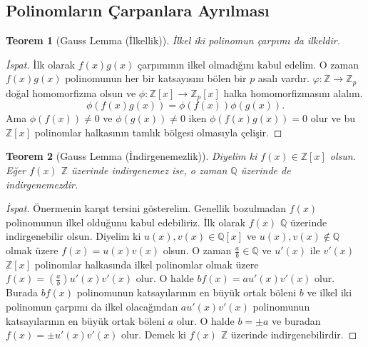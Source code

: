 \documentclass{article}
\newtheorem{thm}{Teorem}[section]
\theoremstyle{definition}
\theoremstyle{remark}
\begin{document}
		\subsection{Polinomların Çarpanlara Ayrılması}
		
		    \begin{thm}[Gauss Lemma (İlkellik)]
		        İlkel iki polinomun çarpımı da ilkeldir.
		    \end{thm}
		    
		    \begin{proof}[İspat]
		        İlk olarak $f(x)g(x)$ çarpımının ilkel olmadığını kabul edelim. O zaman $f(x)g(x)$ polinomunun her bir katsayısını bölen bir $p$ asalı vardır.
		        $\varphi: \mathbb{Z} \to \mathbb{Z}_p$ doğal homomorfizma olsun ve $\phi: \mathbb{Z}[x] \to \mathbb{Z}_p[x]$ halka homomorfizmasını alalım.
		        \begin{equation*}
		            \phi(f(x)g(x)) = \phi(f(x))\phi(g(x)).
		        \end{equation*}
		        Ama $\phi(f(x)) \neq 0$ ve $\phi(g(x)) \neq 0$ iken $\phi(f(x)g(x)) = 0$ olur ve bu $\mathbb{Z}[x]$ polinomlar halkasının tamlık bölgesi olmasıyla çelişir.
		    \end{proof}
			
			\begin{thm}[Gauss Lemma (İndirgenemezlik)]\label{3.2}
			    Diyelim ki $f(x) \in \mathbb{Z}[x]$ olsun. Eğer $f(x)$ $\mathbb{Z}$ üzerinde indirgenemez ise, o zaman $\mathbb{Q}$ üzerinde de indirgenemezdir.
			\end{thm}
			
			\begin{proof}[İspat]
			    Önermenin karşıt tersini gösterelim. Genellik bozulmadan $f(x)$ polinomunun ilkel olduğunu kabul edebiliriz. İlk olarak $f(x)$ $\mathbb{Q}$ üzerinde indirgenebilir olsun. Diyelim ki $u(x), v(x) \in \mathbb{Q}[x]$ ve $u(x), v(x) \notin \mathbb{Q}$ olmak üzere $f(x) = u(x)v(x)$ olsun. O zaman $\frac{a}{b} \in \mathbb{Q}$ ve $u'(x)$ ile $v'(x)$ $\mathbb{Z}[x]$ polinomlar halkasında ilkel polinomlar olmak üzere $f(x) = (\frac{a}{b})u'(x)v'(x)$ olur. O halde $bf(x) = au'(x)v'(x)$ olur. Burada $bf(x)$ polinomunun katsayılarının en büyük ortak böleni $b$ ve ilkel iki polinomun çarpımı da ilkel olacağından $au'(x)v'(x)$ polinomunun katsayılarının en büyük ortak böleni $a$ olur. O halde $b = \pm a$ ve buradan $f(x) = \pm u'(x)v'(x)$ olur. Demek ki $f(x)$ $\mathbb{Z}$ üzerinde indirgenebilirdir.
			\end{proof}
			
\end{document}
